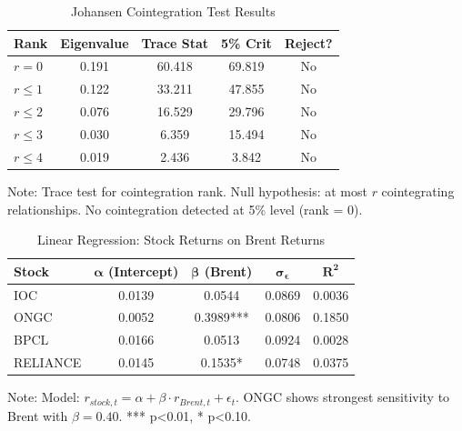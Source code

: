 \documentclass[11pt]{article}
\begin{document}
\begin{table}[htbp]
\centering
\caption{Johansen Cointegration Test Results}
\label{tab:johansen}
\begin{tabular}{lcccc}
\toprule
\textbf{Rank} & \textbf{Eigenvalue} & \textbf{Trace Stat} & \textbf{5\% Crit} & \textbf{Reject?} \\
\midrule
$r = 0$ & 0.191 & 60.418 & 69.819 & No \\
$r \leq 1$ & 0.122 & 33.211 & 47.855 & No \\
$r \leq 2$ & 0.076 & 16.529 & 29.796 & No \\
$r \leq 3$ & 0.030 & 6.359  & 15.494 & No \\
$r \leq 4$ & 0.019 & 2.436  & 3.842  & No \\
\bottomrule
\end{tabular}
\begin{tablenotes}
\small
\item Note: Trace test for cointegration rank. Null hypothesis: at most $r$ cointegrating relationships. No cointegration detected at 5\% level (rank = 0).
\end{tablenotes}
\end{table}

\begin{table}[htbp]
\centering
\caption{Linear Regression: Stock Returns on Brent Returns}
\label{tab:regression}
\begin{tabular}{lcccc}
\toprule
\textbf{Stock} & $\boldsymbol{\alpha}$ (Intercept) & $\boldsymbol{\beta}$ (Brent) & $\boldsymbol{\sigma_{\epsilon}}$ & $\boldsymbol{R^2}$ \\
\midrule
IOC       & 0.0139 & 0.0544   & 0.0869 & 0.0036 \\
ONGC      & 0.0052 & 0.3989*** & 0.0806 & 0.1850 \\
BPCL      & 0.0166 & 0.0513   & 0.0924 & 0.0028 \\
RELIANCE  & 0.0145 & 0.1535*  & 0.0748 & 0.0375 \\
\bottomrule
\end{tabular}
\begin{tablenotes}
\small
\item Note: Model: $r_{stock,t} = \alpha + \beta \cdot r_{Brent,t} + \epsilon_t$. ONGC shows strongest sensitivity to Brent with $\beta=0.40$. *** p<0.01, * p<0.10.
\end{tablenotes}
\end{table}
\end{document}

